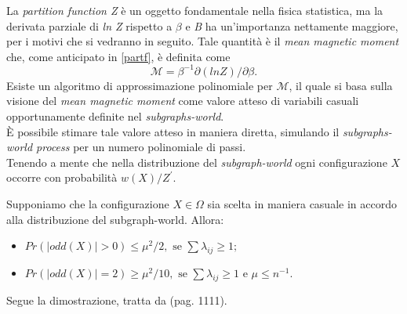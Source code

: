 La \textit{partition function Z} è un oggetto fondamentale nella fisica statistica, ma la derivata parziale di \textit{ln Z} rispetto a $\beta$ e \textit{B} ha un'importanza nettamente maggiore, per i motivi che si vedranno in seguito. Tale quantità è il \textit{mean magnetic moment} che, come anticipato in \ref{partf}, è definita come
\begin{equation}
	\mathcal{M} = \beta^{-1}\partial(lnZ)/\partial\beta.
	\label{mmm}
\end{equation}
Esiste un algoritmo di approssimazione polinomiale per $\mathcal{M}$, il quale si basa sulla visione del \textit{mean magnetic moment} come valore atteso di variabili casuali opportunamente definite nel \textit{subgraphs-world}.\\
È possibile stimare tale valore atteso in maniera diretta, simulando il \textit{subgraphs-world process} per un numero polinomiale di passi.\\
Tenendo a mente che nella distribuzione del \textit{subgraph-world} ogni configurazione $X$ occorre con probabilità $w(X)/Z^{\prime}$.
\begin{lem}
	Supponiamo che la configurazione $X \in \Omega$ sia scelta in maniera casuale in accordo alla distribuzione del subgraph-world. Allora:
	\begin{itemize}
		\item $Pr(|odd(X)| > 0) \leq \mu^2/2, \text{ se } \sum{\lambda_{ij}} \geq 1;$
		\item $Pr(|odd(X)| = 2) \geq \mu^2/10, \text{ se } \sum{\lambda_{ij}} \geq 1 \text{ e } \mu \leq n^{-1}$.
	\end{itemize}
	\label{lem:pr_odd}
\end{lem}
Segue la dimostrazione, tratta da \cite{jerrum1993polynomial} (pag. 1111).
